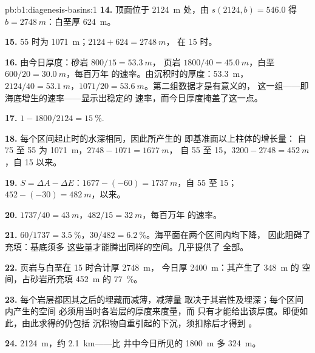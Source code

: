 \begin{solution}{pb:b1:diagenesis-basins:1}
\textbf{14.} 顶面位于 \qty{2124}{m} 处，由 $s(2124, b) = 546.0$ 得 $b =
\qty{2748}{m}$：白垩厚 \qty{624}{m}。

\textbf{15.} \qty{55}{\Ma} 时为 \qty{1071}{m}；$2124 + 624 = \qty{2748}{m}$，
在 \qty{15}{\Ma} 时。

\textbf{16.} 由今日厚度：砂岩 $800/15 = \qty{53.3}{m}$，
页岩 $1800/40 = \qty{45.0}{m}$，白垩 $600/20 = \qty{30.0}{m}$，每百万年
的速率。由沉积时的厚度：\qty{53.3}{m}，$2124/40 =
\qty{53.1}{m}$，$1071/20 = \qty{53.6}{m}$。第二组数据才是有意义的，
这一组——即海底增生的速率——显示出稳定的
速率，而今日厚度掩盖了这一点。

\textbf{17.} $1 - 1800/2124 = \qty{15}{\%}$.

\textbf{18.} 每个区间起止时的水深相同，因此所产生的
即基准面以上柱体的增长量：
自 75 至 \qty{55}{\Ma} 为 \qty{1071}{m}，$2748 - 1071 = \qty{1677}{m}$，
自 55 至 \qty{15}{\Ma}，$3200 - 2748 = \qty{452}{m}$，自 \qty{15}{\Ma} 以来。

\textbf{19.} $S = \Delta A - \Delta E$：$1677 - (-60) = \qty{1737}{m}$，自 55 至
\qty{15}{\Ma}；$452 - (-30) = \qty{482}{m}$，以来。

\textbf{20.} $1737/40 = \qty{43}{m}$，$482/15 = \qty{32}{m}$，每百万年
的速率。

\textbf{21.} $60/1737 = \qty{3.5}{\%}$，$30/482 = \qty{6.2}{\%}$。海平面在两个区间内均下降，
因此阻碍了充填：基底须多
这些量才能腾出同样的空间。几乎提供了
全部。

\textbf{22.} 页岩与白垩在 \qty{15}{\Ma} 时合计厚 \qty{2748}{m}，
今日厚 \qty{2400}{m}：其产生了 \qty{348}{m} 的
空间，占砂岩所充填 \qty{452}{m} 的 \qty{77}{\%}。

\textbf{23.} 每个岩层都因其之后的埋藏而减薄，减薄量
取决于其岩性及埋深；每个区间内产生的空间
必须用当时各岩层的厚度来度量，而
只有才能给出该厚度。即便如此，由此求得的仍包括
沉积物自重引起的下沉，须扣除后才得到
。

\textbf{24.} \qty{2124}{m}，约 \qty{2.1}{km}——比
井中今日所见的 \qty{1800}{m} 多 \qty{324}{m}。
\end{solution}
